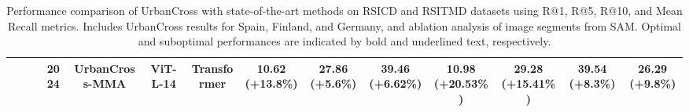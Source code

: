 \begin{table}
{\begin{tabular}{|c|c|c|c|c|c|c|ccc|ccc|c|}
 &  &  & 2024 & {\cellcolor[rgb]{0.902,0.949,0.859}}UrbanCross-MMA & {\cellcolor[rgb]{0.902,0.949,0.859}}ViT-L-14 & {\cellcolor[rgb]{0.902,0.949,0.859}}Transformer & {\cellcolor[rgb]{0.902,0.949,0.859}}\textbf{10.62 (+13.8\%)} & {\cellcolor[rgb]{0.902,0.949,0.859}}\textbf{27.86 (+5.6\%)} & {\cellcolor[rgb]{0.902,0.949,0.859}}\textbf{39.46 (+6.62\%)} & {\cellcolor[rgb]{0.902,0.949,0.859}}\textbf{10.98 (+20.53\%)} & {\cellcolor[rgb]{0.902,0.949,0.859}}\textbf{29.28 (+15.41\%)} & {\cellcolor[rgb]{0.902,0.949,0.859}}\textbf{39.54 (+8.3\%)} & {\cellcolor[rgb]{0.902,0.949,0.859}}\textbf{26.29 (+9.8\%)} \\
\bottomrule
\end{tabular}}
\caption{Performance comparison of UrbanCross with state-of-the-art methods on RSICD and RSITMD datasets using R@1, R@5, R@10, and Mean Recall metrics. Includes UrbanCross results for Spain, Finland, and Germany, and ablation analysis of image segments from SAM. Optimal and suboptimal performances are indicated by bold and underlined text, respectively.}
\label{tab: comparison}
\end{table}